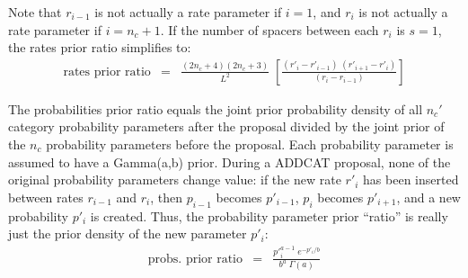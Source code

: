 \documentclass[12pt]{article}
\newcommand{\ncat}{n_c}
\begin{document}
Note that $r_{i-1}$ is not actually a rate parameter if $i=1$, and $r_i$ is not actually a rate parameter if $i=\ncat+1$. If the number of spacers between each $r_i$ is $s=1$, the rates prior ratio simplifies to:
\begin{eqnarray*}
\mbox{rates prior ratio} & = & \frac{(2 \ncat + 4)(2 \ncat + 3)}{L^2} \; 
  \left[ \frac{(r'_i - r'_{i-1}) \; (r'_{i+1} - r'_i)}{(r_i - r_{i-1})} \right]
\end{eqnarray*}

The probabilities prior ratio equals the joint prior probability density of all $\ncat'$ category probability parameters after the proposal divided by the joint prior of the $\ncat$ probability parameters before the proposal. Each probability parameter is assumed to have a Gamma(a,b) prior. During a ADDCAT proposal, none of the original probability parameters change value: if the new rate $r'_i$ has been inserted between rates $r_{i-1}$ and $r_i$, then $p_{i-1}$ becomes $p'_{i-1}$, $p_i$ becomes $p'_{i+1}$, and a new probability $p'_i$ is created. Thus, the probability parameter prior ``ratio'' is really just the prior density of the new parameter $p'_i$:
\begin{eqnarray*}
\mbox{probs. prior ratio} & = & \frac{ {p'}_i^{a-1} \; e^{-p'_i/b} }{ b^a \; \Gamma(a) } 
\end{eqnarray*}
\end{document}
